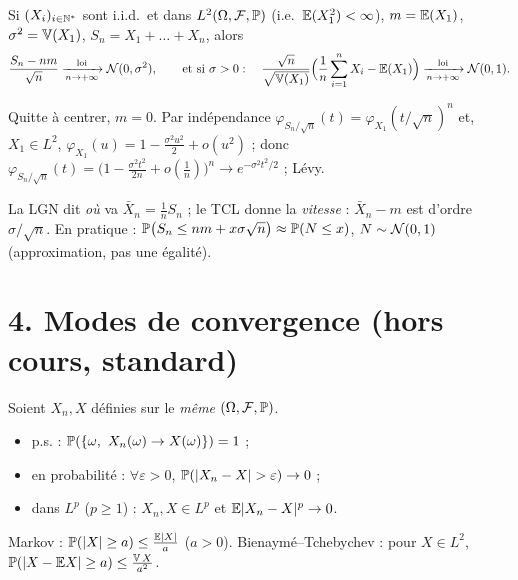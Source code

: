 \documentclass[11pt,a4paper]{article}
\begin{document}
\begin{theoreme}\label{C4:TCL}
Si $(X_i)_{i\in\mathbb{N}^*}$ sont i.i.d.\ et dans $L^2(\Omega,\mathcal{F},\mathbb{P})$ (i.e.\ $\mathbb{E}(X_1^2)<\infty$), $m=\mathbb{E}(X_1)$, $\sigma^2=\operatorname{\mathbb{V}}(X_1)$,
$S_n=X_1+\dots+X_n$, alors
\[\frac{S_n-nm}{\sqrt n}\xrightarrow[n\to+\infty]{\text{loi}}\mathcal{N}(0,\sigma^2),\qquad\text{et si }\sigma>0:\quad
\frac{\sqrt n}{\sqrt{\operatorname{\mathbb{V}}(X_1)}}\Bigl(\frac1n\sum_{i=1}^nX_i-\mathbb{E}(X_1)\Bigr)\xrightarrow[n\to+\infty]{\text{loi}}\mathcal{N}(0,1).\]
\end{theoreme}
\begin{idee}
Quitte à centrer, $m=0$. Par indépendance $\varphi_{S_n/\sqrt n}(t)=\varphi_{X_1}(t/\sqrt n)^n$ et, $X_1\in L^2$,
$\varphi_{X_1}(u)=1-\frac{\sigma^2u^2}2+o(u^2)$ ; donc $\varphi_{S_n/\sqrt n}(t)=\bigl(1-\frac{\sigma^2t^2}{2n}+o(\frac1n)\bigr)^n\to e^{-\sigma^2t^2/2}$ ; Lévy.
\end{idee}
\begin{remarque}
La LGN dit \emph{où} va $\bar X_n=\frac1n S_n$ ; le TCL donne la \emph{vitesse} : $\bar X_n-m$ est d'ordre $\sigma/\sqrt n$.
En pratique : $\mathbb{P}\bigl(S_n\le nm+x\sigma\sqrt n\bigr)\approx\mathbb{P}(N\le x)$, $N\sim\mathcal{N}(0,1)$ (approximation, pas une égalité).
\end{remarque}

\section*{4. Modes de convergence (hors cours, standard)}

\begin{horscours}\label{C4:modes}
Soient $X_n,X$ définies sur le \emph{même} $(\Omega,\mathcal{F},\mathbb{P})$.
\begin{itemize}
  \item p.s. : $\mathbb{P}(\{\omega,\ X_n(\omega)\to X(\omega)\})=1$ ;
  \item en probabilité : $\forall\varepsilon>0$, $\PP(|X_n-X|>\varepsilon)\to0$ ;
  \item dans $L^p$ ($p\ge1$) : $X_n,X\in L^p$ et $\mathbb{E}|X_n-X|^p\to0$.
\end{itemize}
Markov : $\mathbb{P}(|X|\ge a)\le\frac{\mathbb{E}|X|}{a}$ ($a>0$). Bienaymé--Tchebychev : pour $X\in L^2$,
$\mathbb{P}(|X-\mathbb{E} X|\ge a)\le\frac{\operatorname{\mathbb{V}} X}{a^2}$.
\end{horscours}
\end{document}
